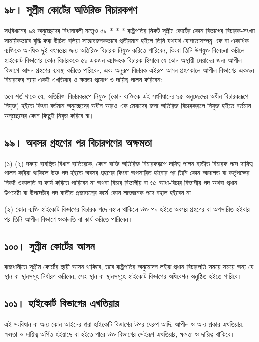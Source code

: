 \documentclass[11pt]{article}
\begin{document}
\subsection{৯৮। সুপ্রীম কোর্টের অতিরিক্ত বিচারকগণ}
\label{sec:org94f18a8}
সংবিধানের ৯৪ অনুচ্ছেদের বিধানাবলী সত্ত্বেও ৫৮ * * * রাষ্ট্রপতির নিকট সুপ্রীম
কোর্টের কোন বিভাগের বিচারক-সংখ্যা সাময়িকভাবে বৃদ্ধি করা উচিত বলিয়া
সন্তোষজনকভাবে প্রতীয়মান হইলে তিনি যথাযথ যোগ্যতাসম্পন্ন এক বা একাধিক
ব্যক্তিকে অনধিক দুই বৎসরের জন্য অতিরিক্ত বিচারক নিযুক্ত করিতে পারিবেন, কিংবা
তিনি উপযুক্ত বিবেচনা করিলে হাইকোর্ট বিভাগের কোন বিচারককে ৫৯ একজন এ্যাডহক
বিচারক হিসাবে যে কোন অস্থায়ী মেয়াদের জন্য আপীল বিভাগে আসন গ্রহণের ব্যবস্থা
করিতে পারিবেন, এবং অনুরূপ বিচারক এইরূপ আসন গ্রহণকালে আপীল বিভাগের একজন
বিচারকের ন্যায় একই এখতিয়ার ও ক্ষমতা প্রয়োগ ও দায়িত্ব পালন করিবেন:

তবে শর্ত থাকে যে, অতিরিক্ত বিচারকরূপে নিযুক্ত (কোন ব্যক্তিকে এই সংবিধানের ৯৫
অনুচ্ছেদের অধীন বিচারকরূপে নিযুক্ত) হইতে কিংবা বর্তমান অনুচ্ছেদের অধীন আরও এক
মেয়াদের জন্য অতিরিক্ত বিচারকরূপে নিযুক্ত হইতে বর্তমান অনুচ্ছেদের কোন কিছুই
নিবৃত্ত করিবে না।

\subsection{৯৯। অবসর গ্রহণের পর বিচারগণের অক্ষমতা}
\label{sec:orgc77befa}
(১) (২) দফায় ব্যবস্থিত বিধান ব্যতিরেকে, কোন ব্যক্তি অতিরিক্ত বিচারকরূপে
দায়িত্ব পালন ব্যতীত বিচারক পদে দায়িত্ব পালন করিয়া থাকিলে উক্ত পদ হইতে অবসর
গ্রহণের কিংবা অপসারিত হইবার পর তিনি কোন আদালত বা কর্তৃপক্ষের নিকট ওকালতি
বা কার্য করিতে পারিবেন না অথবা বিচার বিভাগীয় বা ৬১ আধা-বিচার বিভাগীয় পদ
অথবা প্রধান উপদেষ্টা বা উপদেষ্টার পদ ব্যতীত প্রজাতন্ত্রের কর্মে কোন লাভজনক পদে
বহাল হইবেন না।

(২) কোন ব্যক্তি হাইকোর্ট বিভাগের বিচারক পদে বহাল থাকিলে উক্ত পদ হইতে অবসর
    গ্রহণের বা অপসারিত হইবার পর তিনি আপীল বিভাগে ওকালতি বা কার্য করিতে
    পারিবেন।

\subsection{১০০। সুপ্রীম কোর্টের আসন}
\label{sec:orgf851114}
রাজধানীতে সুপ্রীম কোর্টের স্থায়ী আসন থাকিবে, তবে রাষ্ট্রপতির অনুমোদন লইয়া
প্রধান বিচারপতি সময়ে সময়ে অন্য যে স্থান বা স্থানসমূহ নির্ধারণ করিবেন, সেই
স্থান বা স্থানসমূহে হাইকোর্ট বিভাগের অধিবেশন অনুষ্ঠিত হইতে পারিবে।

\subsection{১০১। হাইকোর্ট বিভাগের এখতিয়ার}
\label{sec:org7d10f88}
এই সংবিধান বা অন্য কোন আইনের দ্বারা হাইকোর্ট বিভাগের উপর যেরূপ আদি, আপীল
ও অন্য প্রকার এখতিয়ার, ক্ষমতা ও দায়িত্ব অর্পিত হইয়াছে বা হইতে পারে উক্ত
বিভাগের সেইরূপ এখতিয়ার, ক্ষমতা ও দায়িত্ব থাকিবে।
\end{document}
